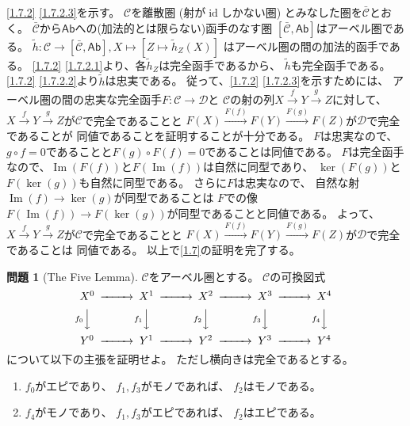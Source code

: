 \documentclass[uplatex,dvipdfmx]{jsarticle}
\makeatletter
\theoremstyle{definition}
\newtheorem{prob}[prob]{問題}
\renewenvironment{proof}[1][\proofname]{
  \pushQED{\qed}%
  \normalfont \topsep6\p@\@plus6\p@\relax
  \trivlist
  \item[\hskip\labelsep
    #1\@addpunct{\textbf{.}}]\ignorespaces
}{%
  \popQED\endtrivlist\@endpefalse
}
\providecommand{\proofname}{証明}
\DeclareMathOperator{\id}{\mathrm{id}}
\DeclareMathOperator{\im}{\mathrm{Im}}
\newcommand{\Ab}{\mathsf{Ab}}
\newcommand\mcC{\mathcal{C}}
\newcommand\mcD{\mathcal{D}}
\makeatother
\begin{document}
\begin{proof}
  \ref{1.7.2} \ref{1.7.2.3}を示す。
  \(\mcC\)を離散圏 (射が\(\id\)しかない圏) とみなした圏を\(\bar{\mcC}\)とおく。
  \(\bar{\mcC}\)から\(\Ab\)への(加法的とは限らない)函手のなす圏
  \([\bar{\mcC},\Ab]\)はアーベル圏である。
  \(\tilde{h}:\mcC\to [\bar{\mcC},\Ab], X\mapsto [Z\mapsto \tilde{h}_Z(X)]\)
  はアーベル圏の間の加法的函手である。
  \ref{1.7.2} \ref{1.7.2.1}より、各\(\tilde{h}_Z\)は完全函手であるから、
  \(\tilde{h}\)も完全函手である。
  \ref{1.7.2} \ref{1.7.2.2}より\(\tilde{h}\)は忠実である。
  従って、\ref{1.7.2} \ref{1.7.2.3}を示すためには、
  アーベル圏の間の忠実な完全函手\(F:\mcC\to \mcD\)と
  \(\mcC\)の射の列\(X\xrightarrow{f} Y \xrightarrow{g} Z\)に対して、
  \(X\xrightarrow{f} Y \xrightarrow{g} Z\)が\(\mcC\)で完全であることと
  \(F(X)\xrightarrow{F(f)}F(Y)\xrightarrow{F(g)}F(Z)\)が\(\mcD\)で完全であることが
  同値であることを証明することが十分である。
  \(F\)は忠実なので、\(g\circ f = 0\)であることと\(F(g)\circ F(f) = 0\)であることは同値である。
  \(F\)は完全函手なので、\(\im(F(f))\)と\(F(\im(f))\)は自然に同型であり、
  \(\ker(F(g))\)と\(F(\ker(g))\)も自然に同型である。
  さらに\(F\)は忠実なので、
  自然な射\(\im(f)\to \ker(g)\)が同型であることは
  \(F\)での像\(F(\im(f))\to F(\ker(g))\)が同型であることと同値である。
  よって、\(X\xrightarrow{f} Y \xrightarrow{g} Z\)が\(\mcC\)で完全であることと
  \(F(X)\xrightarrow{F(f)}F(Y)\xrightarrow{F(g)}F(Z)\)が\(\mcD\)で完全であることは
  同値である。
  以上で\autoref{1.7}の証明を完了する。
\end{proof}











\begin{prob}[The Five Lemma]\label{1.8}
  \(\mcC\)をアーベル圏とする。
  \(\mcC\)の可換図式
  \[
  \begin{CD}
    X^0 @>>> X^1 @>>> X^2 @>>> X^3 @>>> X^4 \\
    @V f_0 VV   @V f_1 VV   @V f_2 VV   @V f_3 VV   @V f_4 VV \\
    Y^0 @>>> Y^1 @>>> Y^2 @>>> Y^3 @>>> Y^4
  \end{CD}
  \]
  について以下の主張を証明せよ。
  ただし横向きは完全であるとする。
  \begin{enumerate}
    \item \label{1.8.1}
    \(f_0\)がエピであり、
    \(f_1,f_3\)がモノであれば、
    \(f_2\)はモノである。
    \item \label{1.8.2}
    \(f_4\)がモノであり、
    \(f_1,f_3\)がエピであれば、
    \(f_2\)はエピである。
  \end{enumerate}
\end{prob}
\end{document}
